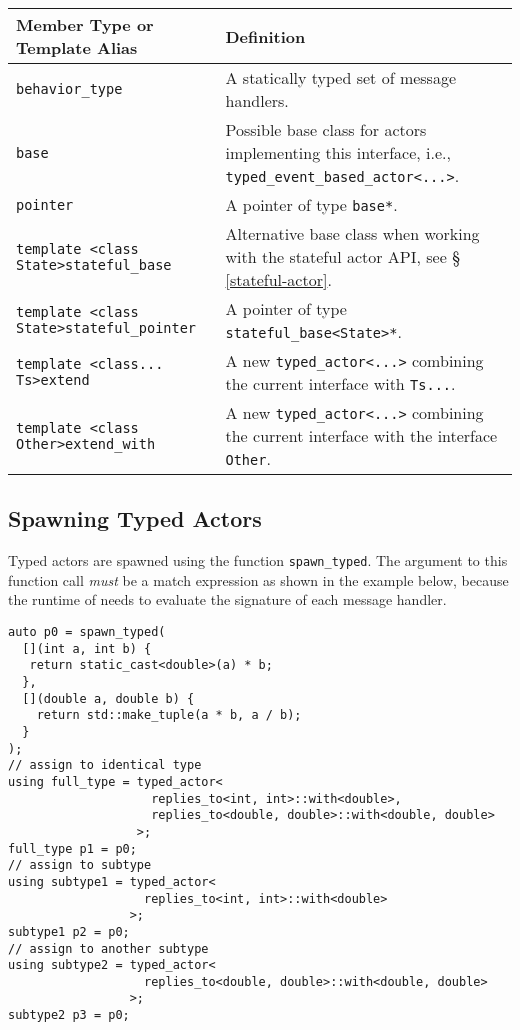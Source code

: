 {\small
\begin{tabular*}{\textwidth}{m{}m{}}
  \textbf{Member Type or Template Alias} & \textbf{Definition} \\
  \hline
  \lstinline^behavior_type^ & A statically typed set of message handlers. \\
  \hline
  \lstinline^base^ & Possible base class for actors implementing this interface, i.e., \lstinline^typed_event_based_actor<...>^. \\
  \hline
  \lstinline^pointer^ & A pointer of type \lstinline^base*^. \\
  \hline
  \lstinline^template <class State>^\newline\lstinline^stateful_base^ & Alternative base class when working with the stateful actor API, see \S\,\ref{stateful-actor}. \\
  \hline
  \lstinline^template <class State>^\newline\lstinline^stateful_pointer^ & A pointer of type \lstinline^stateful_base<State>*^. \\
  \hline
  \lstinline^template <class... Ts>^\newline\lstinline^extend^ & A new \lstinline^typed_actor<...>^ combining the current interface with \lstinline^Ts...^. \\
  \hline
  \lstinline^template <class Other>^\newline\lstinline^extend_with^ & A new \lstinline^typed_actor<...>^ combining the current interface with the interface \lstinline^Other^. \\
  \hline
\end{tabular*}
}

\subsection{Spawning Typed Actors}
\label{sec:strong:spawn}

Typed actors are spawned using the function \lstinline^spawn_typed^.
The argument to this function call \emph{must} be a match expression as shown in the example below, because the runtime of \lib needs to evaluate the signature of each message handler.

\begin{lstlisting}
auto p0 = spawn_typed(
  [](int a, int b) {
   return static_cast<double>(a) * b;
  },
  [](double a, double b) {
    return std::make_tuple(a * b, a / b);
  }
);
// assign to identical type
using full_type = typed_actor<
                    replies_to<int, int>::with<double>,
                    replies_to<double, double>::with<double, double>
                  >;
full_type p1 = p0;
// assign to subtype
using subtype1 = typed_actor<
                   replies_to<int, int>::with<double>
                 >;
subtype1 p2 = p0;
// assign to another subtype
using subtype2 = typed_actor<
                   replies_to<double, double>::with<double, double>
                 >;
subtype2 p3 = p0;
\end{lstlisting}


